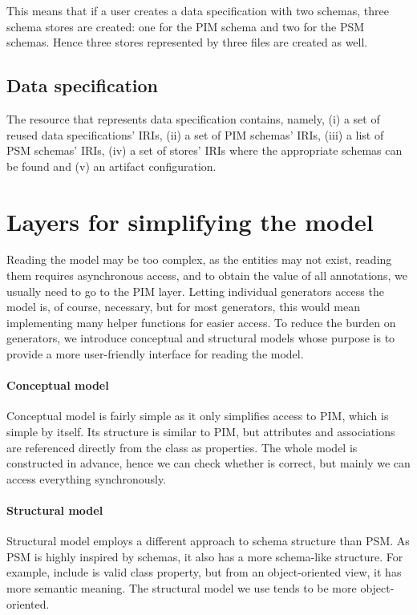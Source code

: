 This means that if a user creates a data specification with two schemas, three schema stores are created: one for the PIM schema and two for the PSM schemas. Hence three stores represented by three files are created as well.

\subsection{Data specification}

The resource that represents data specification contains, namely, (i) a set of reused data specifications' IRIs, (ii) a set of PIM schemas' IRIs, (iii) a list of PSM schemas' IRIs, (iv) a set of stores' IRIs where the appropriate schemas can be found and (v) an artifact configuration.

\section{Layers for simplifying the model}

Reading the model may be too complex, as the entities may not exist, reading them requires asynchronous access, and to obtain the value of all annotations, we usually need to go to the PIM layer. Letting individual generators access the model is, of course, necessary, but for most generators, this would mean implementing many helper functions for easier access. To reduce the burden on generators, we introduce conceptual and structural models whose purpose is to provide a more user-friendly interface for reading the model.

\paragraph{Conceptual model} Conceptual model is fairly simple as it only simplifies access to PIM, which is simple by itself. Its structure is similar to PIM, but attributes and associations are referenced directly from the class as properties. The whole model is constructed in advance, hence we can check whether is correct, but mainly we can access everything synchronously.

\paragraph{Structural model} Structural model employs a different approach to schema structure than PSM. As PSM is highly inspired by schemas, it also has a more schema-like structure. For example, include is valid class property, but from an object-oriented view, it has more semantic meaning. The structural model we use tends to be more object-oriented.

